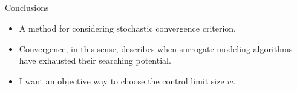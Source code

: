 \documentclass[ xcolor = pdftex, dvipsnames, table ]{beamer}
\begin{document}
\subsection{}
\begin{frame}{Conclusions}
\begin{itemize} 
	\item A method for considering stochastic convergence criterion.\vspace{1cm}
	\item Convergence, in this sense, describes when surrogate modeling algorithms have exhausted their searching potential.\vspace{1cm}
	\item I want an objective way to choose the control limit size $w$. 
\end{itemize}
\end{frame}

%
%
 
\end{document}
